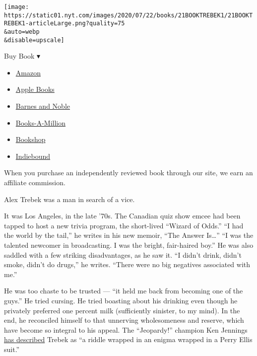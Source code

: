 \texttt{[image: https://static01.nyt.com/images/2020/07/22/books/21BOOKTREBEK1/21BOOKTREBEK1-articleLarge.png?quality=75\\\&auto=webp\\\&disable=upscale]}

Buy Book ▾

\begin{itemize}
\tightlist
\item
  \href{https://www.amazon.com/gp/search?index=books\&tag=NYTBSREV-20\&field-keywords=The+Answer+Is...+Alex+Trebek}{Amazon}
\item
  \href{https://du-gae-books-dot-nyt-du-prd.appspot.com/buy?title=The+Answer+Is...\&author=Alex+Trebek}{Apple
  Books}
\item
  \href{https://www.anrdoezrs.net/click-7990613-11819508?url=https\%3A\%2F\%2Fwww.barnesandnoble.com\%2Fw\%2F\%3Fean\%3D9781982157999}{Barnes
  and Noble}
\item
  \href{https://www.anrdoezrs.net/click-7990613-35140?url=https\%3A\%2F\%2Fwww.booksamillion.com\%2Fp\%2FThe\%2BAnswer\%2BIs...\%2FAlex\%2BTrebek\%2F9781982157999}{Books-A-Million}
\item
  \href{https://bookshop.org/a/3546/9781982157999}{Bookshop}
\item
  \href{https://www.indiebound.org/book/9781982157999?aff=NYT}{Indiebound}
\end{itemize}

When you purchase an independently reviewed book through our site, we
earn an affiliate commission.

Alex Trebek was a man in search of a vice.

It was Los Angeles, in the late '70s. The Canadian quiz show emcee had
been tapped to host a new trivia program, the short-lived ``Wizard of
Odds.'' ``I had the world by the tail,'' he writes in his new memoir,
``The Answer Is\ldots{}'' ``I was the talented newcomer in broadcasting.
I was the bright, fair-haired boy.'' He was also saddled with a few
striking disadvantages, as he saw it. ``I didn't drink, didn't smoke,
didn't do drugs,'' he writes. ``There were no big negatives associated
with me.''

He was too chaste to be trusted --- ``it held me back from becoming one
of the guys.'' He tried cursing. He tried boasting about his drinking
even though he privately preferred one percent milk (sufficiently
sinister, to my mind). In the end, he reconciled himself to that
unnerving wholesomeness and reserve, which have become so integral to
his appeal. The ``Jeopardy!'' champion Ken Jennings
\href{https://www.nytimes.com/2019/03/09/opinion/sunday/alex-trebek-jeopardy-ken-jennings.html}{has
described} Trebek as ``a riddle wrapped in an enigma wrapped in a Perry
Ellis suit.''

